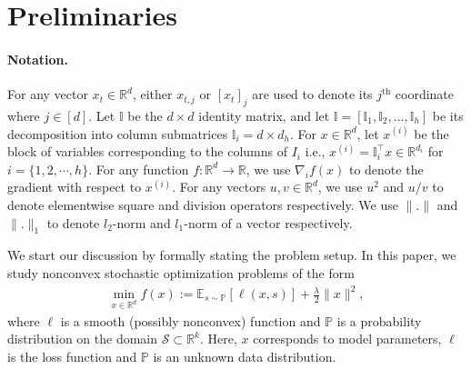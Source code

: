 \documentclass{article} \usepackage{iclr2020_conference,times}
\begin{document}
\fi 
\section{Preliminaries}


\paragraph{Notation.}  
For any vector $x_t \in \mathbb{R}^d$, either $x_{t,j}$ or $[x_t]_{j}$ are used to denote its $j^{\text{th}}$ coordinate where $j \in [d]$.  Let $\mathbb{I}$ be the $d \times d$ identity matrix, and let $\mathbb{I} = [\mathbb{I}_1, \mathbb{I}_2,...,\mathbb{I}_h]$ be its decomposition into column submatrices $\mathbb{I}_i = d \times d_h$. For $x \in \mathbb{R}^d$, let $x^{(i)}$ be the block of variables corresponding to the columns of $I_i$ i.e., $x^{(i)} = \mathbb{I}_i^\top x \in \mathbb{R}^{d_i}$  for
$i = \{1, 2, \cdots ,h\}$. For any function $f:\mathbb{R}^d \rightarrow \mathbb{R}$, we use $\nabla_i f(x)$ to denote the gradient with respect to $x^{(i)}$. For any vectors $u, v \in \mathbb{R}^d$, we use $u^2$ and $u/v$ to denote elementwise square and division operators respectively.
We use $\|.\|$ and $\|.\|_1$ to denote $l_2$-norm and $l_1$-norm of a vector respectively.

We start our discussion by formally stating the problem setup.  In this paper, we study nonconvex stochastic optimization problems of the form
\begin{align}
\label{eq:1}
\min_{x \in \mathbb{R}^d} f(x) := \mathbb{E}_{s \sim \mathbb{P}}[\ell(x, s)] + \frac{\lambda}{2} \|x\|^2,
\end{align}
where $\ell$ is a smooth (possibly nonconvex) function and $\mathbb{P}$ is a probability distribution on the domain $\mathcal{S} \subset \mathbb{R}^k$. 
Here, $x$ corresponds to model parameters, $\ell$ is the loss function and $\mathbb{P}$ is an unknown data distribution. 
\end{document}

